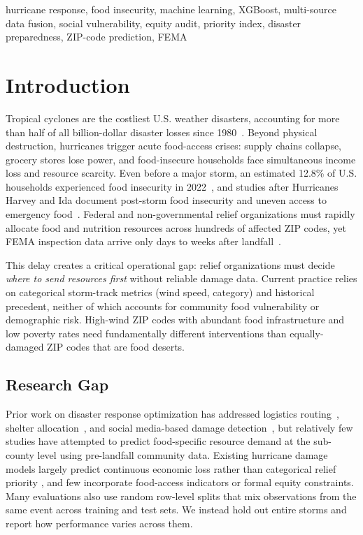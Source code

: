 \documentclass[conference]{IEEEtran}
\renewcommand{\_}{\origunderscore\allowbreak}
\begin{document}
\begin{IEEEkeywords}
hurricane response, food insecurity, machine learning, XGBoost,
multi-source data fusion,
social vulnerability, equity audit, priority index, disaster
preparedness, ZIP-code prediction, FEMA
\end{IEEEkeywords}

\section{Introduction}

Tropical cyclones are the costliest U.S. weather disasters,
accounting for more than half of all billion-dollar disaster
losses since 1980~\cite{noaa_billion_dollar}. Beyond physical destruction,
hurricanes trigger acute food-access crises: supply chains
collapse, grocery stores lose power, and food-insecure households
face simultaneous income loss and resource scarcity. Even before a
major storm, an estimated 12.8\% of U.S. households experienced
food insecurity in 2022~\cite{coleman_jensen_food}, and studies
after Hurricanes Harvey and Ida document post-storm food
insecurity and uneven access to emergency food~\cite{garney_harvey_food, broyles_ida_food}.
Federal and non-governmental relief organizations must rapidly
allocate food and nutrition resources across hundreds of affected
ZIP codes, yet FEMA inspection data arrive only days to weeks after
landfall~\cite{fema_response_timeline}.

This delay creates a critical operational gap: relief
organizations must decide \textit{where to send resources first}
without reliable damage data. Current practice relies on
categorical storm-track metrics (wind speed, category) and
historical precedent, neither of which accounts for community
food vulnerability or demographic risk. High-wind ZIP codes with
abundant food infrastructure and low poverty rates need
fundamentally different interventions than equally-damaged
ZIP codes that are food deserts.

\subsection{Research Gap}
Prior work on disaster response optimization has addressed
logistics routing~\cite{logistics_routing}, shelter
allocation~\cite{shelter_allocation}, and social media-based
damage detection~\cite{imran_social_media}, but relatively few
studies have attempted to predict food-specific resource demand
at the sub-county level using pre-landfall community data.
Existing hurricane damage models largely predict continuous
economic loss rather than categorical relief priority
\cite{hurricane_damage_models}, and few incorporate food-access
indicators or formal equity constraints. Many evaluations also
use random row-level splits that mix observations from the same
event across training and test sets. We instead hold out entire
storms and report how performance varies across them.
\end{document}
